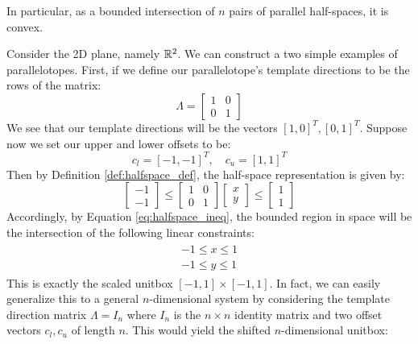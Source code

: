 %
\noindent In particular, as a bounded intersection of $n$ pairs of parallel half-spaces, it is convex.
%
\begin{example}
\label{ex:simple_ptope}
Consider the 2D plane, namely ${\mathbb{R}}^2$. We can construct a two simple examples of parallelotopes. First, if we define our parallelotope's template directions to be the rows of the matrix:
%
\begin{equation}
  \Lambda = \begin{bmatrix} 1 & 0 \\ 0 & 1 \end{bmatrix}
\end{equation}
%
We see that our template directions will be the vectors $[1,0]^T, [0,1]^T$. Suppose now we set our upper and lower offsets to be:
%
\begin{equation}
  c_l = [-1,-1]^T, \quad c_u = [1,1]^T
\end{equation}
Then by Definition \ref{def:halfspace_def}, the half-space representation is given by:
\begin{equation}
\begin{bmatrix}
  -1 \\ -1
\end{bmatrix} \leq \begin{bmatrix}
    1 & 0 \\ 0 & 1
  \end{bmatrix}\begin{bmatrix}
   x \\ y
  \end{bmatrix} \leq \begin{bmatrix}
    1 \\ 1
  \end{bmatrix}
\end{equation}
%
Accordingly, by Equation \ref{eq:halfspace_ineq}, the bounded region in space will be the intersection of the following linear constraints:
%
\begin{align}
  \begin{split}
  -1 \leq x \leq 1 \\
  -1 \leq y \leq 1
  \end{split}
\end{align}
This is exactly the scaled unitbox $[-1,1] \times [-1,1]$. In fact, we can easily generalize this to a general $n$-dimensional system by considering the template direction matrix $\Lambda = I_n$ where $I_n$ is the $n \times n$ identity matrix and two offset vectors $c_l, c_u$ of length $n$. This would yield the shifted $n$-dimensional unitbox:


\end{example}

